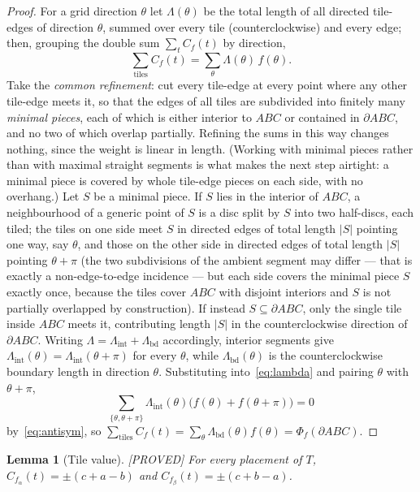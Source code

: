 \documentclass[11pt,reqno]{amsart}
\theoremstyle{plain}
\newtheorem{lemma}[theorem]{Lemma}
\theoremstyle{definition}
\newcommand{\lab}[1]{\hfill\textnormal{\footnotesize\textsc{[#1]}}}
\begin{document}
\begin{proof}
For a grid direction $\theta$ let $\Lambda(\theta)$ be the total length of all directed tile-edges
of direction $\theta$, summed over every tile (counterclockwise) and every edge; then, grouping the
double sum $\sum_t C_f(t)$ by direction,
\begin{equation}\label{eq:lambda}
\sum_{\text{tiles}}C_f(t)=\sum_{\theta}\Lambda(\theta)\,f(\theta).
\end{equation}
Take the \emph{common refinement}: cut every tile-edge at every point where any other tile-edge
meets it, so that the edges of all tiles are subdivided into finitely many \emph{minimal pieces},
each of which is either interior to $ABC$ or contained in $\partial ABC$, and no two of which
overlap partially. Refining the sums in this way changes nothing, since the weight is linear in
length. (Working with minimal pieces rather than with maximal straight segments is what makes the
next step airtight: a minimal piece is covered by whole tile-edge pieces on each side, with no
overhang.) Let $S$ be a minimal piece. If $S$ lies in the interior of $ABC$, a
neighbourhood of a generic point of $S$ is a disc split by $S$ into two half-discs, each tiled; the
tiles on one side meet $S$ in directed edges of total length $|S|$ pointing one way, say $\theta$,
and those on the other side in directed edges of total length $|S|$ pointing $\theta+\pi$ (the two subdivisions of
the ambient segment may differ --- that is exactly a non-edge-to-edge incidence --- but each side
covers the minimal piece $S$ exactly once, because the tiles cover $ABC$ with disjoint interiors and
$S$ is not partially overlapped by construction). If instead $S\subseteq\partial ABC$, only the single
tile inside $ABC$ meets it, contributing length $|S|$ in the counterclockwise direction of
$\partial ABC$. Writing $\Lambda=\Lambda_{\mathrm{int}}+\Lambda_{\mathrm{bd}}$ accordingly,
interior segments give $\Lambda_{\mathrm{int}}(\theta)=\Lambda_{\mathrm{int}}(\theta+\pi)$ for every
$\theta$, while $\Lambda_{\mathrm{bd}}(\theta)$ is the counterclockwise boundary length in direction
$\theta$. Substituting into~\eqref{eq:lambda} and pairing $\theta$ with $\theta+\pi$,
\[
\sum_{\{\theta,\theta+\pi\}}\Lambda_{\mathrm{int}}(\theta)\bigl(f(\theta)+f(\theta+\pi)\bigr)=0
\]
by~\eqref{eq:antisym}, so $\sum_{\text{tiles}}C_f(t)=\sum_\theta\Lambda_{\mathrm{bd}}(\theta)f(\theta)
=\Phi_f(\partial ABC)$.
\end{proof}

\begin{lemma}[Tile value]\label{lem:value}\lab{PROVED}
For every placement of $T$, $C_{f_\alpha}(t)=\pm(c+a-b)$ and $C_{f_\beta}(t)=\pm(c+b-a)$.
\end{lemma}
\end{document}
